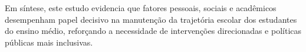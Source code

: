 \documentclass[english, spanish, brazilian]{RBIEarticle} %
\begin{document}
Em síntese, este estudo evidencia que fatores pessoais, sociais e acadêmicos desempenham papel decisivo na manutenção da trajetória escolar dos estudantes do ensino médio, reforçando a necessidade de intervenções direcionadas e políticas públicas mais inclusivas.























\pagebreak
\pagebreak
\nocite{*}
\printbibliography
\end{document}
